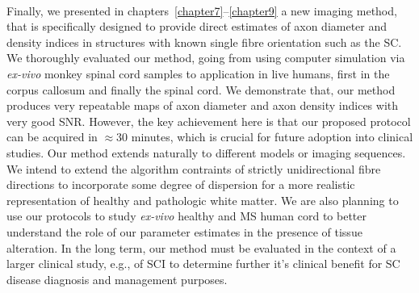 \paragraph{}
Finally, we presented in chapters~\ref{chapter7}--\ref{chapter9} a new imaging method, that is specifically designed to provide direct estimates of axon diameter and density indices in structures with known single fibre orientation such as the {\gls{SC}}. We thoroughly evaluated our method, going from using computer simulation via \emph{ex-vivo} monkey spinal cord samples to application in live humans, first in the corpus callosum and finally the spinal cord. We demonstrate that‚ our method produces very repeatable maps of axon diameter and axon density indices with very good SNR. However, the key achievement here is that our proposed protocol can be acquired in $\approx$30 minutes, which is crucial for future adoption into clinical studies. Our method extends naturally to different models or imaging sequences. We intend to extend the algorithm contraints of strictly unidirectional fibre directions to incorporate some degree of dispersion for a more realistic representation of healthy and pathologic white matter. We are also planning to use our protocols to study \emph{ex-vivo} healthy and MS human cord to better understand the role of our parameter estimates in the presence of tissue alteration. In the long term, our method must be evaluated in the context of a larger clinical study, e.g., of \gls{SCI} to determine further it's clinical benefit for \gls{SC} disease diagnosis and management purposes. 
